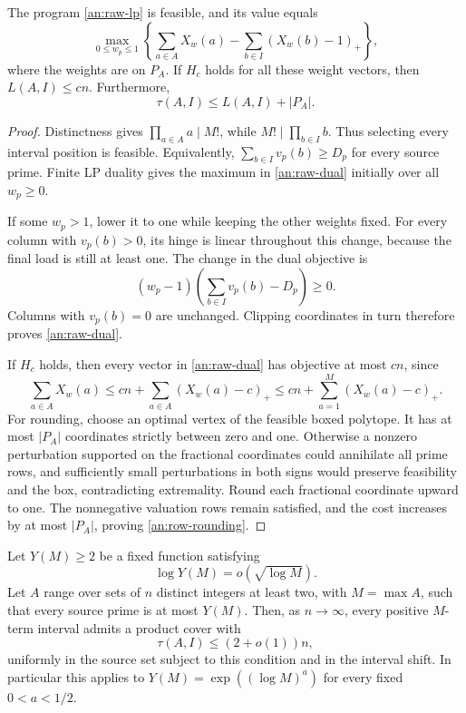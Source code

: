 \begin{lemma}
\label{an:lp-bridge}
The program \eqref{an:raw-lp} is feasible, and its value equals
\begin{equation}
 \max_{0\le w_p\le1}
 \left\{\sum_{a\in A}X_w(a)
          -\sum_{b\in I}(X_w(b)-1)_+\right\},
 \label{an:raw-dual}
\end{equation}
where the weights are on \(P_A\). If \(H_c\) holds for all these
weight vectors, then \(L(A,I)\le cn\). Furthermore,
\begin{equation}
 \tau(A,I)\le L(A,I)+|P_A|.
 \label{an:row-rounding}
\end{equation}
\end{lemma}

\begin{proof}
Distinctness gives \(\prod_{a\in A}a\mid M!\), while
\(M!\mid\prod_{b\in I}b\). Thus selecting every interval position is
feasible. Equivalently, \(\sum_{b\in I}v_p(b)\ge D_p\) for every
source prime. Finite LP duality gives the maximum in
\eqref{an:raw-dual} initially over all \(w_p\ge0\).

If some \(w_p>1\), lower it to one while keeping the other weights
fixed. For every column with \(v_p(b)>0\), its hinge is linear
throughout this change, because the final load is still at least one.
The change in the dual objective is
\[
 (w_p-1)\left(\sum_{b\in I}v_p(b)-D_p\right)\ge0.
\]
Columns with \(v_p(b)=0\) are unchanged. Clipping coordinates in turn
therefore proves \eqref{an:raw-dual}.

If \(H_c\) holds, then every vector in \eqref{an:raw-dual} has
objective at most \(cn\), since
\[
 \sum_{a\in A}X_w(a)
 \le cn+\sum_{a\in A}(X_w(a)-c)_+
 \le cn+\sum_{a=1}^{M}(X_w(a)-c)_+.
\]
For rounding, choose an optimal vertex of the feasible boxed polytope.
It has at most \(|P_A|\) coordinates strictly between zero and one.
Otherwise a nonzero perturbation supported on the fractional
coordinates could annihilate all prime rows, and sufficiently small
perturbations in both signs would preserve feasibility and the box,
contradicting extremality. Round each fractional coordinate upward to
one. The nonnegative valuation rows remain satisfied, and the cost
increases by at most \(|P_A|\), proving \eqref{an:row-rounding}.
\end{proof}

\begin{corollary}
\label{an:smooth-cover}
Let \(Y(M)\ge2\) be a fixed function satisfying
\[
 \log Y(M)=o(\sqrt{\log M}).
\]
Let \(A\) range over sets of \(n\) distinct integers at least two,
with \(M=\max A\), such that every source prime is at most \(Y(M)\).
Then, as \(n\to\infty\), every positive \(M\)-term interval admits
a product cover with
\[
 \tau(A,I)\le(2+o(1))n,
\]
uniformly in the source set subject to this condition and in the interval
shift. In particular this applies to
\(Y(M)=\exp((\log M)^a)\) for every fixed \(0<a<1/2\).
\end{corollary}

